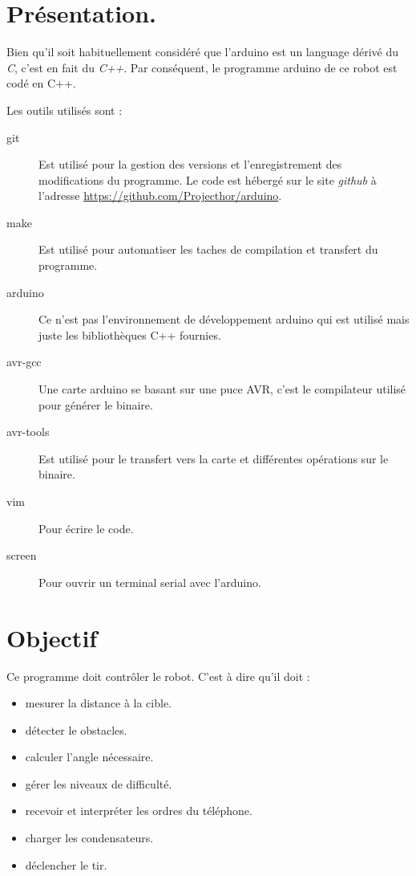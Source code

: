 
\section{Présentation.}
Bien qu'il soit habituellement considéré que l'arduino est un language dérivé du \emph{C}, c'est en fait du \emph{C++}. Par conséquent, le programme arduino de ce robot est codé en C++.

Les outils utilisés sont :
\begin{description}
	\item[git] Est utilisé pour la gestion des versions et l'enregistrement des modifications du programme. Le code est hébergé sur le site \emph{github} à l'adresse \url{https://github.com/Projecthor/arduino}.
	\item[make] Est utilisé pour automatiser les taches de compilation et transfert du programme.
	\item[arduino] Ce n'est pas l'environnement de développement arduino qui est utilisé mais juste les bibliothèques C++ fournies.
	\item[avr-gcc] Une carte arduino se basant sur une puce AVR, c'est le compilateur utilisé pour générer le binaire.
	\item[avr-tools] Est utilisé pour le transfert vers la carte et différentes opérations sur le binaire.
	\item[vim] Pour écrire le code.
	\item[screen] Pour ouvrir un terminal serial avec l'arduino.
\end{description}

\section{Objectif}
Ce programme doit contrôler le robot. C'est à dire qu'il doit :\begin{itemize}
	\item mesurer la distance à la cible.
	\item détecter le obstacles.
	\item calculer l'angle nécessaire.
	\item gérer les niveaux de difficulté.
	\item recevoir et interpréter les ordres du téléphone.
	\item charger les condensateurs.
	\item déclencher le tir.
\end{itemize}

